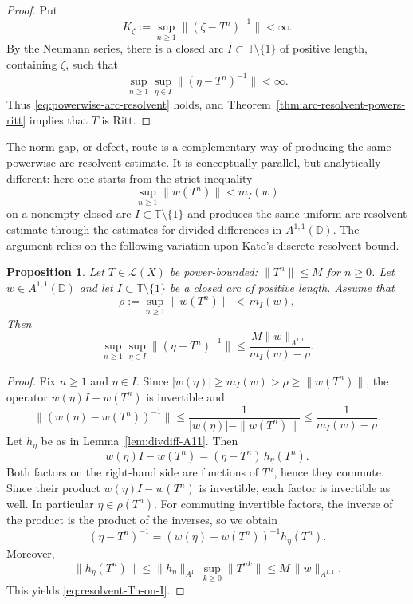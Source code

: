 \documentclass[11pt]{amsart}
\numberwithin{equation}{section}
\newtheorem{proposition}[theorem]{Proposition}
\theoremstyle{definition}
\theoremstyle{plain}
\def\T{\mathbb{T}}
\def\L{L}
\def\D{\mathbb{D}}
\renewcommand{\L}{\mathcal L}
\begin{document}
\begin{proof}
Put
\[
        K_\zeta:=\sup_{n\ge1}\|(\zeta -T^n)^{-1}\|<\infty.
\]
By the Neumann series, there is a closed arc
$I\subset\T\setminus\{1\}$ of positive length, containing $\zeta$, such that
\[
        \sup_{n\ge1}\sup_{\eta\in I}\|(\eta -T^n)^{-1}\|<\infty.
\]
Thus \eqref{eq:powerwise-arc-resolvent} holds, and
Theorem~\ref{thm:arc-resolvent-powers-ritt} implies that $T$ is Ritt.
\end{proof}

 
The norm-gap, or defect, route is a complementary way of
producing the same
powerwise arc-resolvent estimate.
It is conceptually parallel, but analytically different: here one starts from the strict inequality
\[
  \sup_{n\ge1}\|w(T^n)\|<m_I(w)
\]
on a nonempty closed arc $I\subset\T\setminus\{1\}$ and produces the same uniform
arc-resolvent estimate through the estimates for divided differences in $A^{1,1}(\D)$.
The argument relies on the following variation upon Kato's discrete resolvent bound.

\begin{proposition}\label{prop:defect-to-arc-resolvent}
Let $T\in\L(X)$ be power-bounded: $\|T^n\|\le M$ for $n\ge0$.
Let $w\in A^{1,1}(\D)$ and let 
$I\subset\T\setminus\{1\}$ be a closed arc
of positive length. Assume that
\begin{equation}\label{eq:defect-wTn}
  \rho:=\sup_{n\ge1}\|w(T^n)\| \,<\, m_I(w),%
\end{equation}
Then
\begin{equation}\label{eq:resolvent-Tn-on-I}
  \sup_{n\ge1}\sup_{\eta\in I}\|(\eta -T^n)^{-1}\|
  \le \frac{M\|w\|_{A^{1,1}}}{m_I(w)-\rho}.
\end{equation}
\end{proposition}

\begin{proof}
Fix $n\ge1$ and $\eta\in I$. Since $|w(\eta)|\ge m_I(w)>\rho\ge \|w(T^n)\|$,
the operator $w(\eta)I-w(T^n)$ is invertible and
\[
  \|(w(\eta)-w(T^n))^{-1}\|
  \le \frac{1}{|w(\eta)|-\|w(T^n)\|}
  \le \frac{1}{m_I(w)-\rho}.
\]
Let $h_\eta$ be as in Lemma~\ref{lem:divdiff-A11}. Then
\[
  w(\eta)I-w(T^n)=(\eta-T^n)\,h_\eta(T^n).
\]
Both factors on the right-hand side are functions of $T^n$, hence they commute.
Since their product $w(\eta)I-w(T^n)$ is invertible, each factor is invertible as well.
In particular $\eta\in\rho(T^n)$. For commuting invertible factors, the inverse of the
product is the product of the inverses, %
so we obtain
\[
  (\eta -T^n)^{-1}%
  =(w(\eta)-w(T^n))^{-1}h_\eta(T^n).
\]
Moreover,
\[
  \|h_\eta(T^n)\|
  \le \|h_\eta\|_{A^1}\,\sup_{k\ge0}\|T^{nk}\|
  \le M\,\|w\|_{A^{1,1}}.
\]
This yields \eqref{eq:resolvent-Tn-on-I}.
\end{proof}
\end{document}
